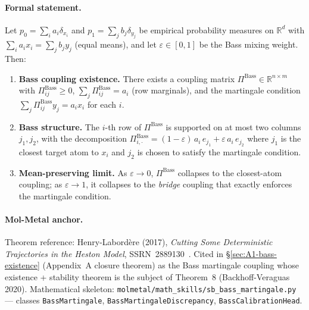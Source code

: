 \paragraph{Formal statement.}
\begin{theorem}
\label{thm:T7-sb-bass}
Let $p_0 = \sum_i a_i \delta_{x_i}$ and $p_1 = \sum_j b_j
\delta_{y_j}$ be empirical probability measures on $\mathbb{R}^d$
with $\sum_i a_i x_i = \sum_j b_j y_j$ (equal means), and let
$\varepsilon \in [0, 1]$ be the Bass mixing weight.  Then:
\begin{enumerate}
  \item[(i)] \textbf{Bass coupling existence.}  There exists a
    coupling matrix $\Pi^{\mathrm{Bass}} \in \mathbb{R}^{n \times m}$
    with $\Pi^{\mathrm{Bass}}_{ij} \ge 0$, $\sum_j \Pi^{\mathrm{Bass}}_{ij} = a_i$
    (row marginals), and the martingale condition $\sum_j
    \Pi^{\mathrm{Bass}}_{ij} y_j = a_i x_i$ for each $i$.
  \item[(ii)] \textbf{Bass structure.}  The $i$-th row of
    $\Pi^{\mathrm{Bass}}$ is supported on at most two columns $j_1,
    j_2$, with the decomposition $\Pi^{\mathrm{Bass}}_{i, \cdot} =
    (1 - \varepsilon) \, a_i \, e_{j_1} + \varepsilon \, a_i \, e_{j_2}$
    where $j_1$ is the closest target atom to $x_i$ and $j_2$ is
    chosen to satisfy the martingale condition.
  \item[(iii)] \textbf{Mean-preserving limit.}  As
    $\varepsilon \to 0$, $\Pi^{\mathrm{Bass}}$ collapses to the
    closest-atom coupling; as $\varepsilon \to 1$, it collapses to
    the \emph{bridge} coupling that exactly enforces the martingale
    condition.
\end{enumerate}
\end{theorem}

\paragraph{Mol-Metal anchor.}
Theorem reference: Henry-Labord\`ere (2017), \emph{Cutting Some
Deterministic Trajectories in the Heston Model},
SSRN~2889130~\cite{henry_labordere2017bass}.  Cited in
\S\ref{sec:A1-bass-existence} (Appendix~A closure theorem) as the
Bass martingale coupling whose existence + stability theorem is
the subject of Theorem~8 (Backhoff-Veraguas 2020).  Mathematical
skeleton:
\texttt{molmetal/math\_skills/sb\_bass\_martingale.py} ---
classes \texttt{BassMartingale},
\texttt{BassMartingaleDiscrepancy}, \texttt{BassCalibrationHead}.

